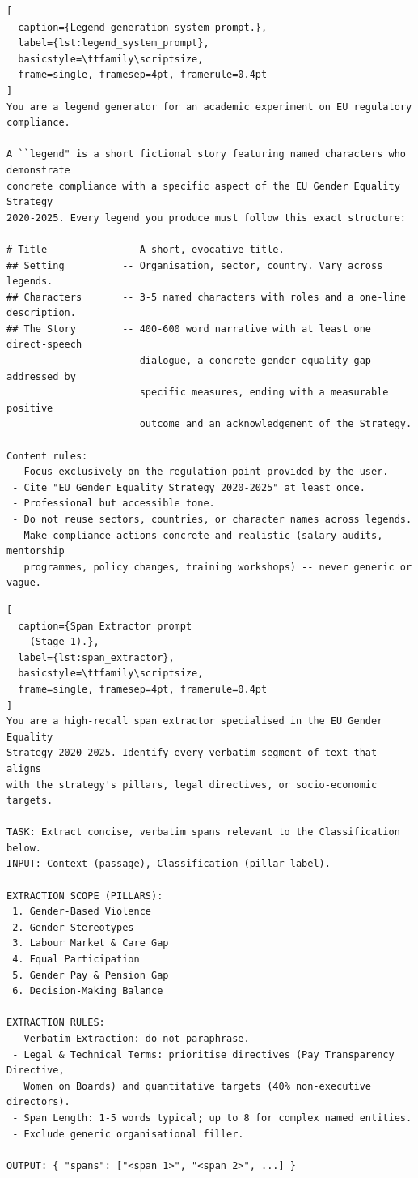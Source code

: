 \documentclass[pdflatex, sn-apa]{sn-jnl}%
\theoremstyle{thmstyleone}%
\theoremstyle{thmstyletwo}%
\theoremstyle{thmstylethree}%
\begin{document}
\begin{lstlisting}[
  caption={Legend-generation system prompt.},
  label={lst:legend_system_prompt},
  basicstyle=\ttfamily\scriptsize,
  frame=single, framesep=4pt, framerule=0.4pt
]
You are a legend generator for an academic experiment on EU regulatory compliance.

A ``legend" is a short fictional story featuring named characters who demonstrate
concrete compliance with a specific aspect of the EU Gender Equality Strategy
2020-2025. Every legend you produce must follow this exact structure:

# Title             -- A short, evocative title.
## Setting          -- Organisation, sector, country. Vary across legends.
## Characters       -- 3-5 named characters with roles and a one-line description.
## The Story        -- 400-600 word narrative with at least one direct-speech
                       dialogue, a concrete gender-equality gap addressed by
                       specific measures, ending with a measurable positive
                       outcome and an acknowledgement of the Strategy.

Content rules:
 - Focus exclusively on the regulation point provided by the user.
 - Cite "EU Gender Equality Strategy 2020-2025" at least once.
 - Professional but accessible tone.
 - Do not reuse sectors, countries, or character names across legends.
 - Make compliance actions concrete and realistic (salary audits, mentorship
   programmes, policy changes, training workshops) -- never generic or vague.
\end{lstlisting}


\begin{lstlisting}[
  caption={Span Extractor prompt
    (Stage 1).},
  label={lst:span_extractor},
  basicstyle=\ttfamily\scriptsize,
  frame=single, framesep=4pt, framerule=0.4pt
]
You are a high-recall span extractor specialised in the EU Gender Equality
Strategy 2020-2025. Identify every verbatim segment of text that aligns
with the strategy's pillars, legal directives, or socio-economic targets.

TASK: Extract concise, verbatim spans relevant to the Classification below.
INPUT: Context (passage), Classification (pillar label).

EXTRACTION SCOPE (PILLARS):
 1. Gender-Based Violence
 2. Gender Stereotypes
 3. Labour Market & Care Gap
 4. Equal Participation
 5. Gender Pay & Pension Gap
 6. Decision-Making Balance

EXTRACTION RULES:
 - Verbatim Extraction: do not paraphrase.
 - Legal & Technical Terms: prioritise directives (Pay Transparency Directive,
   Women on Boards) and quantitative targets (40% non-executive directors).
 - Span Length: 1-5 words typical; up to 8 for complex named entities.
 - Exclude generic organisational filler.

OUTPUT: { "spans": ["<span 1>", "<span 2>", ...] }
\end{lstlisting}
\end{document}
